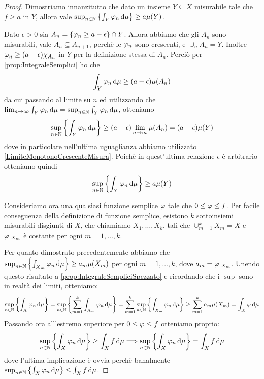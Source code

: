 \begin{proof}
	Dimostriamo innanzitutto che dato un insieme $Y\subseteq X$ misurabile tale che $f\ge a$ in $Y$, allora vale $\sup_{n\in\mathbb N}\left\{\int_Y\varphi_n\,\mathrm d\mu\right\}\ge a\mu(Y)$.
	
	Dato $\epsilon>0$ sia $A_n=\{\varphi_n\ge a-\epsilon\}\cap Y$. Allora abbiamo che gli $A_n$ sono misurabili, vale $A_n\subseteq A_{n+1}$, perchè le $\varphi_n$ sono crescenti, e $\cup_nA_n=Y$. Inoltre $\varphi_n\ge (a-\epsilon)\chi_{A_n}$ in $Y$ per la definizione stessa di $A_n$. Perciò per \cref{prop:IntegraleSemplici} ho che
	\begin{equation*}
		\int_Y\varphi_n\,\mathrm d\mu\ge(a-\epsilon)\mu(A_n)
	\end{equation*}
	da cui passando al limite su $n$ ed utilizzando che $\lim_{n\to\infty}\int_Y\varphi_n\,\mathrm d\mu=\sup_{n\in\mathbb N}\int_Y\varphi_n\,\mathrm d\mu$, otteniamo
	\begin{equation*}
		\sup_{n\in\mathbb N}\left\{\int_Y\varphi_n\,\mathrm d\mu\right\}\ge(a-\epsilon)\lim_{n\to\infty}\mu(A_n)=(a-\epsilon)\mu(Y)
	\end{equation*}
	dove in particolare nell'ultima uguaglianza abbiamo utilizzato \cref{LimiteMonotonoCrescenteMisura}. Poichè in quest'ultima relazione $\epsilon$ è arbitrario otteniamo quindi
	\begin{equation*}
		\sup_{n\in\mathbb N}\left\{\int_Y\varphi_n\,\mathrm d\mu\right\}\ge a\mu(Y)
	\end{equation*}

	Consideriamo ora una qualsiasi funzione semplice $\varphi$ tale che $0\le \varphi\le f$. Per facile conseguenza della definizione di funzione semplice, esistono $k$ sottoinsiemi misurabili disgiunti di $X$, che chiamiamo $X_1,\dots,X_k$, tali che $\cup_{m=1}^kX_m=X$ e $\varphi|_{X_m}$ è costante per ogni $m=1,\dots,k$.
	
	Per quanto dimostrato precedentemente abbiamo che $\sup_{n\in\mathbb N}\left\{\int_{X_m}\varphi_n\,\mathrm d\mu\right\}\ge a_m\mu(X_m)$ per ogni $m=1,\dots,k$, dove $a_m=\varphi|_{X_m}$. Unendo questo risultato a \cref{prop:IntegraleSempliciSpezzato} e ricordando che i $\sup$ sono in realtà dei limiti, otteniamo:
	\begin{equation*}
		\sup_{n\in\mathbb N}\left\{\int_X\varphi_n\,\mathrm d\mu\right\}=\sup_{n\in\mathbb N}\left\{\sum_{m=1}^k \int_{X_m}\varphi_n\,\mathrm d \mu\right\}=\sum_{m=1}^k\sup_{n\in\mathbb N}\left\{ \int_{X_m}\varphi_n\,\mathrm d \mu\right\}\ge \sum_{m=1}^ka_m\mu(X_m)=\int_X\varphi\,\mathrm d\mu
	\end{equation*}
	Passando ora all'estremo superiore per $0\le \varphi \le f$ otteniamo proprio:
	\begin{equation*}
		\sup_{n\in\mathbb N}\left\{\int_X\varphi_n\,\mathrm d\mu\right\}\ge \int_X f \,\mathrm d\mu\Longrightarrow \sup_{n\in\mathbb N}\left\{\int_X\varphi_n\,\mathrm d\mu\right\}= \int_X f\,\mathrm d\mu
	\end{equation*}
	dove l'ultima implicazione è ovvia perchè banalmente $\sup_{n\in\mathbb N}\left\{\int_X\varphi_n\,\mathrm d\mu\right\}\le \int_X f\,\mathrm d\mu$.
\end{proof}

